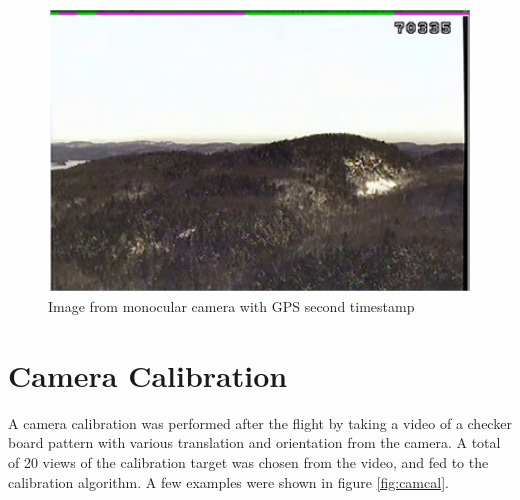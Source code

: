 \begin{figure}[h]
  \centering
  \includegraphics[width=12cm,keepaspectratio=true]{./Figures/video_snapshot.jpg}
  \caption{Image from monocular camera with GPS second timestamp}
  \label{fig:video_snapshot}
\end{figure}

\FloatBarrier

\section{Camera Calibration}\label{sec:camcal}

A camera calibration was performed after the flight by taking a video
of a checker board pattern with various translation and orientation
from the camera. A total of 20 views of the calibration target was
chosen from the video, and fed to the calibration algorithm. A few
examples were shown in figure \ref{fig:camcal}.

